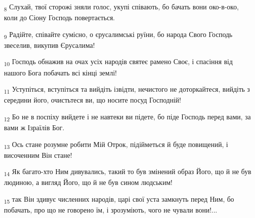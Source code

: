 \begin{tcolorbox}
\textsubscript{8} Слухай, твої сторожі зняли голос, укупі співають, бо бачать вони око-в-око, коли до Сіону Господь повертається.
\end{tcolorbox}
\begin{tcolorbox}
\textsubscript{9} Радійте, співайте сумісно, о єрусалимські руїни, бо народа Свого Господь звеселив, викупив Єрусалима!
\end{tcolorbox}
\begin{tcolorbox}
\textsubscript{10} Господь обнажив на очах усіх народів святеє рамено Своє, і спасіння від нашого Бога побачать всі кінці землі!
\end{tcolorbox}
\begin{tcolorbox}
\textsubscript{11} Уступіться, вступіться та вийдіть ізвідти, нечистого не доторкайтеся, вийдіть з середини його, очистьтеся ви, що носите посуд Господній!
\end{tcolorbox}
\begin{tcolorbox}
\textsubscript{12} Бо не в поспіху вийдете і не навтеки ви підете, бо піде Господь перед вами, за вами ж Ізраїлів Бог.
\end{tcolorbox}
\begin{tcolorbox}
\textsubscript{13} Ось стане розумне робити Мій Отрок, підійметься й буде повищений, і височенним Він стане!
\end{tcolorbox}
\begin{tcolorbox}
\textsubscript{14} Як багато-хто Ним дивувались, такий то був змінений образ Його, що й не був людиною, а вигляд Його, що й не був сином людським!
\end{tcolorbox}
\begin{tcolorbox}
\textsubscript{15} так Він здивує численних народів, царі свої уста замкнуть перед Ним, бо побачать, про що не говорено їм, і зрозуміють, чого не чували вони!...
\end{tcolorbox}
